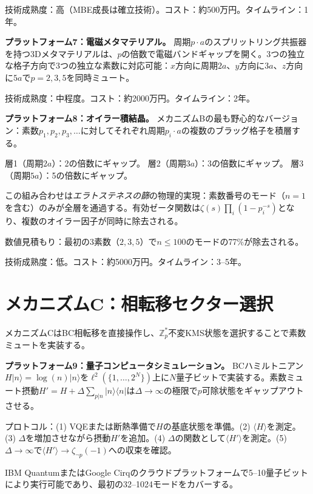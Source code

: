 \documentclass[11pt,a4paper]{article}
\begin{document}
技術成熟度：高（MBE成長は確立技術）。コスト：約500万円。タイムライン：1年。

\textbf{プラットフォーム7：電磁メタマテリアル。}
周期$p \cdot a$のスプリットリング共振器を持つ3Dメタマテリアルは、$p$の倍数で電磁バンドギャップを開く。3つの独立な格子方向で3つの独立な素数に対応可能：$x$方向に周期$2a$、$y$方向に$3a$、$z$方向に$5a$で$p = 2, 3, 5$を同時ミュート。

技術成熟度：中程度。コスト：約2000万円。タイムライン：2年。

\textbf{プラットフォーム8：オイラー積結晶。}
メカニズムBの最も野心的なバージョン：素数$p_1, p_2, p_3, \ldots$に対してそれぞれ周期$p_i \cdot a$の複数のブラッグ格子を積層する。

層1（周期$2a$）：2の倍数にギャップ。
層2（周期$3a$）：3の倍数にギャップ。
層3（周期$5a$）：5の倍数にギャップ。

この組み合わせは\emph{エラトステネスの篩}の物理的実現：素数番号のモード（$n=1$を含む）のみが全層を通過する。有効ゼータ関数は$\zeta(s)\prod_i(1-p_i^{-s})$となり、複数のオイラー因子が同時に除去される。

数値見積もり：最初の3素数（$2, 3, 5$）で$n \leq 100$のモードの77\%が除去される。

技術成熟度：低。コスト：約5000万円。タイムライン：3--5年。

\section{メカニズムC：相転移セクター選択}
\label{sec:mech_c}

メカニズムCはBC相転移を直接操作し、$\mathbb{Z}_p^*$不変KMS状態を選択することで素数ミュートを実装する。

\textbf{プラットフォーム9：量子コンピュータシミュレーション。}
BCハミルトニアン$H|n\rangle = \log(n)|n\rangle$を$\ell^2(\{1,\ldots,2^N\})$上に$N$量子ビットで実装する。素数ミュート摂動$H' = H + \Delta\sum_{p|n}|n\rangle\langle n|$は$\Delta \to \infty$の極限で$p$可除状態をギャップアウトさせる。

プロトコル：(1) VQEまたは断熱準備で$H$の基底状態を準備。(2) $\langle H\rangle$を測定。(3) $\Delta$を増加させながら摂動$H'$を追加。(4) $\Delta$の関数として$\langle H'\rangle$を測定。(5) $\Delta \to \infty$で$\langle H'\rangle \to \zeta_{\neg p}(-1)$への収束を確認。

IBM QuantumまたはGoogle Cirqのクラウドプラットフォームで5--10量子ビットにより実行可能であり、最初の32--1024モードをカバーする。
\end{document}
